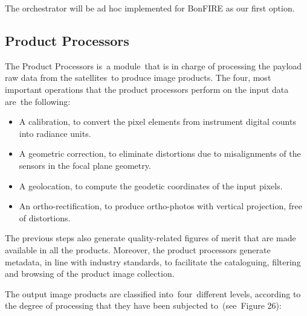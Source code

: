 \documentclass[a4paper]{article}
\newcommand\liststyleLFOxxvii{%
\renewcommand\labelitemi{[F0B7?]}
\renewcommand\labelitemii{o}
\renewcommand\labelitemiii{[F0A7?]}
\renewcommand\labelitemiv{[F0B7?]}
}
\begin{document}
\bigskip

The orchestrator will be ad hoc implemented for BonFIRE as our first
option.\ 

\subsection[Product Processors]{Product Processors}
\hypertarget{Toc381777212}{}
\bigskip

The Product Processors is\ a module\ that is in charge of processing the
payload raw data from the satellites\ to produce image products. The
four, most important operations that the product processors perform on
the input data are\ the following:

\liststyleLFOxxvii
\begin{itemize}
\item A calibration, to convert the pixel elements from instrument
digital counts into radiance units.
\item A geometric correction, to eliminate distortions due to
misalignments of the sensors in the focal plane geometry.
\item A geolocation, to compute the geodetic coordinates of the input
pixels.
\item An ortho-rectification, to produce ortho-photos with vertical
projection, free of distortions.
\end{itemize}

\bigskip

The previous steps also generate quality-related figures of merit that
are made available in all the products. Moreover, the product
processors generate metadata, in line with industry standards, to
facilitate the cataloguing, filtering and browsing of the product image
collection.


\bigskip

The output image products are classified into\ four\ different levels,
according to the degree of processing that they have been subjected
to\ (see\ Figure 26):


\bigskip
\end{document}
